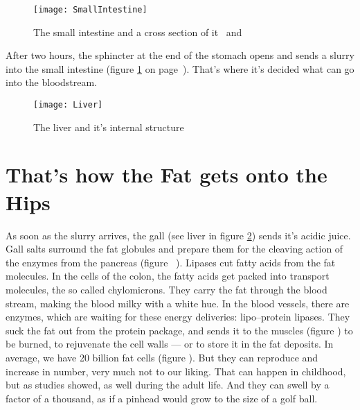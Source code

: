 \documentclass[../main.tex]{subfiles}
\begin{document}
\begin{figure}[htb!]
  \texttt{[image: SmallIntestine]}
  \caption{The small intestine and a cross section of it~\cite{SmallInt} and~\cite{LayersInt}}\label{SmallInt}
  \end{figure}


 
After two hours, the sphincter at the end of the stomach opens and sends a slurry into the small intestine
(figure \ref{SmallInt} on page~\pageref{SmallInt}).
That's where it's decided what can go into the bloodstream.


\begin{figure}[htb!]
  \texttt{[image: Liver]}
  \caption{The liver and it's internal structure~\cite{LayersInt}}\label{liver}
  \end{figure}


\section{That's how the Fat gets onto the Hips}

As soon as the slurry arrives, the gall (see liver in figure \ref{liver}) sends it's acidic juice.
Gall salts surround the fat globules and prepare them for the cleaving action of the enzymes from the pancreas (figure~%
).
Lipases cut fatty acids from the fat molecules.
In the cells of the colon, the fatty acids get packed into transport molecules, the so called chylomicrons.
They carry the fat through the blood stream, making the blood milky with a white hue.
In the blood vessels, there are enzymes, which are waiting for these energy deliveries: lipo--protein lipases.
They suck the fat out from the protein package, and sends it to the muscles (figure%
) to be burned, to rejuvenate the cell walls --- or to store it in the fat deposits.
In average, we have 20 billion fat cells (figure%
).
But they can reproduce and increase in number, very much not to our liking.
That can happen in childhood, but as studies showed, as well during the adult life.
And they can swell by a factor of a thousand, as if a pinhead would grow to the size of a golf ball.
\end{document}
